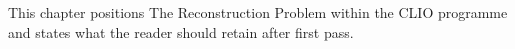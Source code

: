 This chapter positions The Reconstruction Problem within the CLIO programme and states what the reader should retain after first pass.
